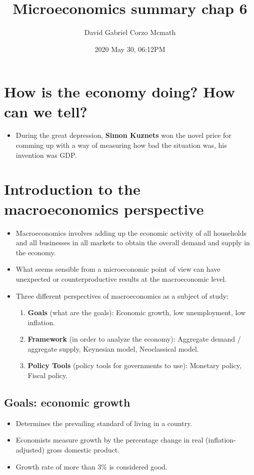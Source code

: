 \documentclass{article}
\title{Microeconomics summary chap 6}
\date{2020 May 30, 06:12PM}
\author{David Gabriel Corzo Mcmath}
\begin{document}
\maketitle

\section{How is the economy doing? How can we tell?}
\begin{itemize}
    \item During the great depression, \textbf{Simon Kuznets} won the novel price for comming up with a way of measuring how bad the situation was, his invention was GDP.
\end{itemize}


\section{Introduction to the macroeconomics perspective}
\begin{itemize}
    \item Macroeconomics involves adding up the economic activity of all households and all businesses in all markets to obtain the overall demand and supply in the economy.
    \item What seems sensible from a microeconomic point of view can have unexpected or counterproductive results at the macroeconomic level.
    \item Three different perspectives of macroeconomics as a subject of study: 
        \begin{enumerate}
            \item \textbf{Goals} (what are the goals): Economic growth, low unemployment, low inflation.
            \item \textbf{Framework} (in order to analyze the economy): Aggregate demand / aggregate supply, Keynesian model, Neoclassical model. 
            \item \textbf{Policy Tools} (policy tools for governments to use): Monetary policy, Fiscal policy.  
        \end{enumerate}
\end{itemize}

\subsection{Goals: economic growth}
\begin{itemize}
    \item Determines the prevailing standard of living in a country.
    \item Economists measure growth by the percentage change in real (inflation-adjusted) gross domestic product.
    \item Growth rate of more than 3\% is considered good. 
\end{itemize}
\end{document}
